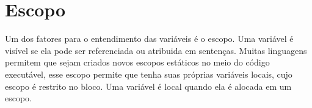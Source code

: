 \documentclass[12pt, onecolumn]{article}
\begin{document}
	\section{Escopo}
	Um dos fatores para o entendimento das variáveis é o escopo. Uma variável
	é visível se ela pode ser referenciada ou atribuida em sentenças.
	Muitas linguagens permitem que sejam criados novos escopos estáticos no
	meio do código executável, esse escopo permite que tenha suas próprias
	variáveis locais, cujo escopo é restrito no bloco. Uma variável é local
	quando ela é alocada em um escopo.\\
	\\
\end{document}
